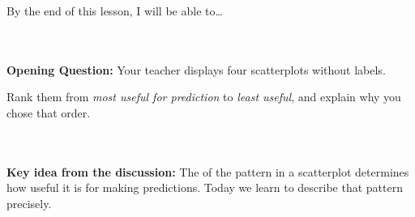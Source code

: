 \documentclass[10pt]{article}
\begin{document}
\namedateperiod

\vspace{0.12in}

\begin{objectivebox}
\small By the end of this lesson, I will be able to\dots\\[4pt]
\writeline\\[1pt]
\writeline\\[1pt]
\writeline
\end{objectivebox}

\vspace{0.1in}

\begin{vocabbox}
\end{vocabbox}

\vspace{0.1in}

\begin{hookbox}
\small\textbf{Opening Question:} Your teacher displays four scatterplots without labels.

\vspace{6pt}
Rank them from \textit{most useful for prediction} to \textit{least useful}, and explain why
you chose that order.\\[8pt]
\writeline\\[1pt]\writeline\\[1pt]\writeline

\vspace{4pt}
\textbf{Key idea from the discussion:} The \blank{5cm} of the pattern in a scatterplot
determines how useful it is for making predictions. Today we learn to describe that pattern precisely.
\end{hookbox}

\vspace{0.1in}
\end{document}
